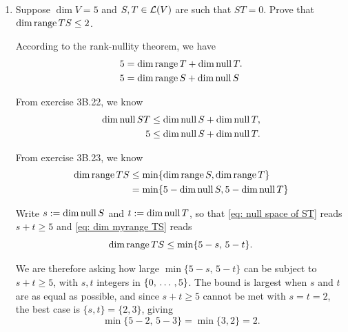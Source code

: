 \begin{xrcs}
  \begin{enumerate}[label=\textbf{(\alph*)}]
    \item {
    Suppose $\dim V = 5$ and $S, T \in \mathcal{L} (V)$ are such that $ST = 0$. Prove that $\dim \operatorname{range} TS \leq 2$.

    \begin{xprf}
      According to the rank-nullity theorem, we have
      \begin{equation}
        \begin{aligned}
          5 &= \dim \operatorname{range} T + \dim \operatorname{null} T. \\
          5 &= \dim \operatorname{range} S + \dim \operatorname{null} S
        \end{aligned}
      \end{equation}

      From exercise 3B.22, we know
      \begin{equation}
        \begin{aligned}
          \label{eq: null space of ST}
          \dim \operatorname{null} ST & \leq \dim \operatorname{null} S + \dim \operatorname{null} T, \\
          5 & \leq \dim \operatorname{null} S + \dim \operatorname{null} T.
        \end{aligned}
      \end{equation}

      From exercise 3B.23, we know
      \begin{equation}
        \begin{aligned}
          \label{eq: dim myrange TS}
          \dim \operatorname{range} TS & \leq \min \{ \dim \operatorname{range} S, \dim \operatorname{range} T\} \\
          & =     \min \{ 5 - \dim \operatorname{null} S, 5 - \dim \operatorname{null} T \}
        \end{aligned}
      \end{equation}

      Write $s := \dim \operatorname{null} S$ and $t := \dim \operatorname{null} T$, so that \eqref{eq: null space of ST} reads $s + t \geq 5$ and \eqref{eq: dim myrange TS} reads
      \begin{equation}
        \dim \operatorname{range} TS \leq \min \{5-s, \, 5-t\}.
      \end{equation}

      We are therefore asking how large $\min \{5-s,\, 5-t\}$ can be subject to $s+t \geq 5$, with $s,t$ integers in $\{0, {\, \ldots \,\,}, 5\}$. The bound is largest when $s$ and $t$ are as equal as possible, and since $s+t \geq 5$ cannot be met with $s = t = 2$, the best case is $\{s,t\} = \{2,3\}$, giving
      \begin{equation}
        \min \{5-2, \, 5-3\} = \min \{3,2\} = 2.
      \end{equation}


\end{xprf}}
\end{enumerate}
\end{xrcs}
